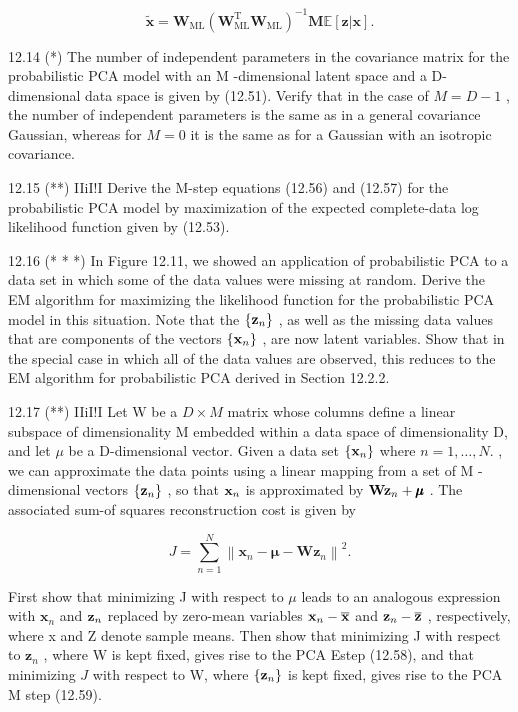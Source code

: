\documentclass[
  10
]{article}
\begin{document}
\[
\widetilde {\mathbf {x}} = \mathbf {W} _ {\mathrm{ML}} (\mathbf {W} _ {\mathrm{ML}} ^ {\mathrm{T}} \mathbf {W} _ {\mathrm{ML}}) ^ {- 1} \mathbf {M} \mathbb {E} [ \mathbf {z} | \mathbf {x} ].\tag{12.94}
\]

12.14 (*) The number of independent parameters in the covariance matrix
for the probabilistic PCA model with an M -dimensional latent space and
a D-dimensional data space is given by (12.51). Verify that in the case
of \(M = D - 1\) , the number of independent parameters is the same as
in a general covariance Gaussian, whereas for \(M = 0\) it is the same
as for a Gaussian with an isotropic covariance.

12.15 (**) IIiI!I Derive the M-step equations (12.56) and (12.57) for
the probabilistic PCA model by maximization of the expected
complete-data log likelihood function given by (12.53).

12.16 (* * *) In Figure 12.11, we showed an application of probabilistic
PCA to a data set in which some of the data values were missing at
random. Derive the EM algorithm for maximizing the likelihood function
for the probabilistic PCA model in this situation. Note that the
\(\left\{ { { \bf { z } } _ { n } } \right\}\) , as well as the missing
data values that are components of the vectors
\(\left\{ { \bf x } _ { n } \right\}\) , are now latent variables. Show
that in the special case in which all of the data values are observed,
this reduces to the EM algorithm for probabilistic PCA derived in
Section 12.2.2.

12.17 (**) IIiI!I Let W be a \(D \times M\) matrix whose columns define
a linear subspace of dimensionality M embedded within a data space of
dimensionality D, and let \(\mu\) be a D-dimensional vector. Given a
data set \(\left\{ { \bf x } _ { n } \right\}\) where
\(n = 1 , \ldots , N .\) , we can approximate the data points using a
linear mapping from a set of M -dimensional vectors
\(\left\{ { { \bf { z } } _ { n } } \right\}\) , so that
\({ \bf x } _ { n }\) is approximated by
\({ \bf W } { \bf z } _ { n } + \pmb { \mu }\) . The associated sum-of
squares reconstruction cost is given by

\[
J = \sum_ {n = 1} ^ {N} \left\| \mathbf {x} _ {n} - \boldsymbol {\mu} - \mathbf {W} \mathbf {z} _ {n} \right\| ^ {2}.\tag{12.95}
\]

First show that minimizing J with respect to \(\mu\) leads to an
analogous expression with \(\mathbf { x } _ { n }\) and
\({ \bf z } _ { n }\) replaced by zero-mean variables
\({ \bf x } _ { n } - \overline { { \bf x } }\) and
\({ \bf z } _ { n } - \overline { { { \bf z } } }\) , respectively,
where x and Z denote sample means. Then show that minimizing J with
respect to \(\mathbf { z } _ { n }\) , where W is kept fixed, gives rise
to the PCA Estep (12.58), and that minimizing \(J\) with respect to W,
where \(\left\{ { { \bf { z } } _ { n } } \right\}\) is kept fixed,
gives rise to the PCA M step (12.59).
\end{document}
